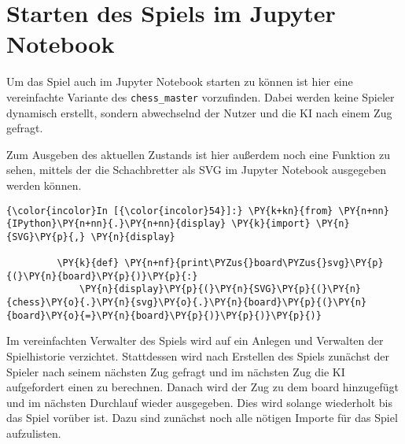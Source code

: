 \hypertarget{starten-des-spiels-im-jupyter-notebook}{%
\section{Starten des Spiels im Jupyter
Notebook}\label{starten-des-spiels-im-jupyter-notebook}}

Um das Spiel auch im Jupyter Notebook starten zu können ist hier eine
vereinfachte Variante des \texttt{chess\_master} vorzufinden. Dabei
werden keine Spieler dynamisch erstellt, sondern abwechselnd der Nutzer und die KI nach einem Zug gefragt.

Zum Ausgeben des aktuellen Zustands ist hier außerdem noch eine Funktion zu sehen, mittels der die Schachbretter als SVG im Jupyter Notebook ausgegeben werden können.

    \begin{Verbatim}[commandchars=\\\{\}]
{\color{incolor}In [{\color{incolor}54}]:} \PY{k+kn}{from} \PY{n+nn}{IPython}\PY{n+nn}{.}\PY{n+nn}{display} \PY{k}{import} \PY{n}{SVG}\PY{p}{,} \PY{n}{display}
         
         \PY{k}{def} \PY{n+nf}{print\PYZus{}board\PYZus{}svg}\PY{p}{(}\PY{n}{board}\PY{p}{)}\PY{p}{:}
             \PY{n}{display}\PY{p}{(}\PY{n}{SVG}\PY{p}{(}\PY{n}{chess}\PY{o}{.}\PY{n}{svg}\PY{o}{.}\PY{n}{board}\PY{p}{(}\PY{n}{board}\PY{o}{=}\PY{n}{board}\PY{p}{)}\PY{p}{)}\PY{p}{)}
\end{Verbatim}

    Im vereinfachten Verwalter des Spiels wird auf ein Anlegen und Verwalten der Spielhistorie verzichtet. Stattdessen wird nach Erstellen des Spiels zunächst der Spieler nach seinem nächsten Zug gefragt und im nächsten Zug die KI aufgefordert einen zu berechnen. Danach wird der Zug zu dem board hinzugefügt und im nächsten Durchlauf wieder ausgegeben. Dies wird solange wiederholt bis das Spiel vorüber ist. Dazu sind zunächst noch alle nötigen Importe für das Spiel aufzulisten.

